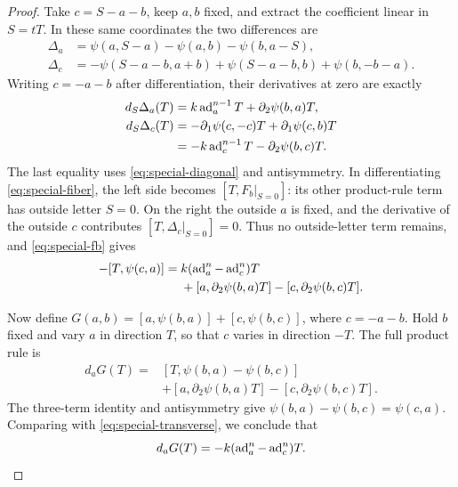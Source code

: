 \begin{proof}
Take \(c=S-a-b\), keep \(a,b\) fixed, and extract the coefficient
linear in \(S=tT\).  In these same coordinates the two differences
are
\begin{align*}
 \Delta_a&=\psi(a,S-a)-\psi(a,b)-\psi(b,a-S),\\
 \Delta_c&=-\psi(S-a-b,a+b)+\psi(S-a-b,b)+\psi(b,-b-a).
\end{align*}
Writing \(c=-a-b\) after differentiation, their derivatives at zero
are exactly
\begin{align*}
 d_S\Delta_a(T)
   &=k\operatorname{ad}_a^{n-1}T+\partial_2\psi(b,a)T,\\
 d_S\Delta_c(T)
   &=-\partial_1\psi(c,-c)T+\partial_1\psi(c,b)T\\
   &=-k\operatorname{ad}_c^{n-1}T-\partial_2\psi(b,c)T.
\end{align*}
The last equality uses \eqref{eq:special-diagonal} and
antisymmetry.  In differentiating \eqref{eq:special-fiber}, the left
side becomes \([T,F_b|_{S=0}]\): its other product-rule term has
outside letter \(S=0\).  On the right the outside \(a\) is fixed,
and the derivative of the outside \(c\) contributes
\([T,\Delta_c|_{S=0}]=0\).  Thus no outside-letter term remains,
and \eqref{eq:special-fb} gives
\begin{equation}\label{eq:special-transverse}
 \begin{split}
 -[T,\psi(c,a)]={}&k(\operatorname{ad}_a^n-\operatorname{ad}_c^n)T\\
 &+[a,\partial_2\psi(b,a)T]
       -[c,\partial_2\psi(b,c)T].
 \end{split}
\end{equation}

Now define
\(G(a,b)=[a,\psi(b,a)]+[c,\psi(b,c)]\), where \(c=-a-b\).
Hold \(b\) fixed and vary \(a\) in direction \(T\), so that \(c\)
varies in direction \(-T\).  The full product rule is
\begin{align*}
 d_aG(T)={}&[T,\psi(b,a)-\psi(b,c)]\\
           &+[a,\partial_2\psi(b,a)T]
              -[c,\partial_2\psi(b,c)T].
\end{align*}
The three-term identity and antisymmetry give
\(\psi(b,a)-\psi(b,c)=\psi(c,a)\).  Comparing with
\eqref{eq:special-transverse}, we conclude that
\begin{equation}\label{eq:special-dg}
 d_aG(T)=-k(\operatorname{ad}_a^n-\operatorname{ad}_c^n)T.
\end{equation}


\end{proof}
